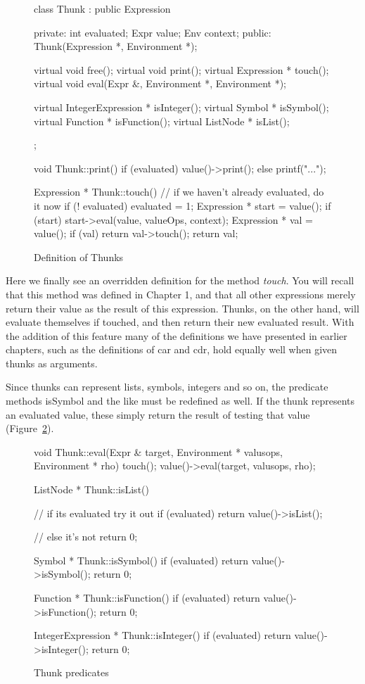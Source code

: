 \begin{figure}
\begin{cprog}
class Thunk : public Expression {
private:
	int evaluated;
	Expr value;
	Env context;
public:
	Thunk(Expression *, Environment *);

	virtual void free();
	virtual void print();
	virtual Expression * touch();
	virtual void eval(Expr &, Environment *, Environment *);

	virtual IntegerExpression * isInteger();
	virtual Symbol * isSymbol();
	virtual Function * isFunction();
	virtual ListNode * isList();
};

void Thunk::print()
{
	if (evaluated)
		value()->print();
	else
		printf("...");
}

Expression * Thunk::touch()
{
	// if we haven't already evaluated, do it now
	if (! evaluated) {
		evaluated = 1;
		Expression * start = value();
		if (start)
			start->eval(value, valueOps, context);
		}
	Expression * val = value();
	if (val)
		return val->touch();
	return val;
}
\end{cprog}
\caption{Definition of Thunks}\label{thunk}
\end{figure}

Here we finally see an overridden definition for the method {\em touch}.
You will recall that this method was defined in Chapter 1, and that all
other expressions merely return their value as the result of this
expression.  Thunks, on the other hand, will evaluate themselves if
touched, and then return their new evaluated result.  With the addition of
this feature many of the definitions we have presented in earlier chapters,
such as the definitions of {\sf car} and {\sf cdr}, hold equally well 
when given thunks as arguments.

Since thunks can represent lists, symbols, integers and so on, the
predicate methods {\sf isSymbol} and the like must be redefined as well.
If the thunk represents an evaluated value, these simply return the result
of testing that value (Figure~\ref{thunkpred}).

\begin{figure}
\begin{cprog}
void Thunk::eval(Expr & target, Environment * valusops, Environment * rho)
{
	touch();
	value()->eval(target, valusops, rho);
}

ListNode * Thunk::isList()
{
	// if its evaluated try it out
	if (evaluated) return value()->isList();

	// else it's not
	return 0;
}

Symbol * Thunk::isSymbol()
{
	if (evaluated) return value()->isSymbol();
	return 0;
}

Function * Thunk::isFunction()
{
	if (evaluated) return value()->isFunction();
	return 0;
}

IntegerExpression * Thunk::isInteger()
{
	if (evaluated) return value()->isInteger();
	return 0;
}
\end{cprog}
\caption{Thunk predicates}\label{thunkpred}
\end{figure}

